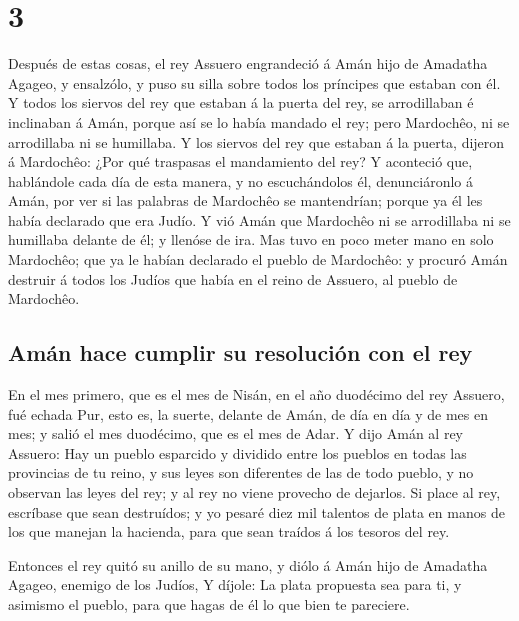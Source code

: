 \hypertarget{section-17-3}{%
\section{3}\label{section-17-3}}

 Después de estas cosas, el rey Assuero engrandeció á Amán
hijo de Amadatha Agageo, y ensalzólo, y puso su silla sobre todos los
príncipes que estaban con él.  Y todos los siervos del rey
que estaban á la puerta del rey, se arrodillaban é inclinaban á Amán,
porque así se lo había mandado el rey; pero Mardochêo, ni se arrodillaba
ni se humillaba.  Y los siervos del rey que estaban á la
puerta, dijeron á Mardochêo: ¿Por qué traspasas el mandamiento del rey?
 Y aconteció que, hablándole cada día de esta manera, y no
escuchándolos él, denunciáronlo á Amán, por ver si las palabras de
Mardochêo se mantendrían; porque ya él les había declarado que era
Judío.  Y vió Amán que Mardochêo ni se arrodillaba ni se
humillaba delante de él; y llenóse de ira.  Mas tuvo en
poco meter mano en solo Mardochêo; que ya le habían declarado el pueblo
de Mardochêo: y procuró Amán destruir á todos los Judíos que había en el
reino de Assuero, al pueblo de Mardochêo.

\hypertarget{amuxe1n-hace-cumplir-su-resoluciuxf3n-con-el-rey}{%
\subsection{Amán hace cumplir su resolución con el
rey}\label{amuxe1n-hace-cumplir-su-resoluciuxf3n-con-el-rey}}

 En el mes primero, que es el mes de Nisán, en el año
duodécimo del rey Assuero, fué echada Pur, esto es, la suerte, delante
de Amán, de día en día y de mes en mes; y salió el mes duodécimo, que es
el mes de Adar.  Y dijo Amán al rey Assuero: Hay un pueblo
esparcido y dividido entre los pueblos en todas las provincias de tu
reino, y sus leyes son diferentes de las de todo pueblo, y no observan
las leyes del rey; y al rey no viene provecho de dejarlos.
 Si place al rey, escríbase que sean destruídos; y yo
pesaré diez mil talentos de plata en manos de los que manejan la
hacienda, para que sean traídos á los tesoros del rey.

 Entonces el rey quitó su anillo de su mano, y diólo á
Amán hijo de Amadatha Agageo, enemigo de los Judíos,  Y
díjole: La plata propuesta sea para ti, y asimismo el pueblo, para que
hagas de él lo que bien te pareciere.

